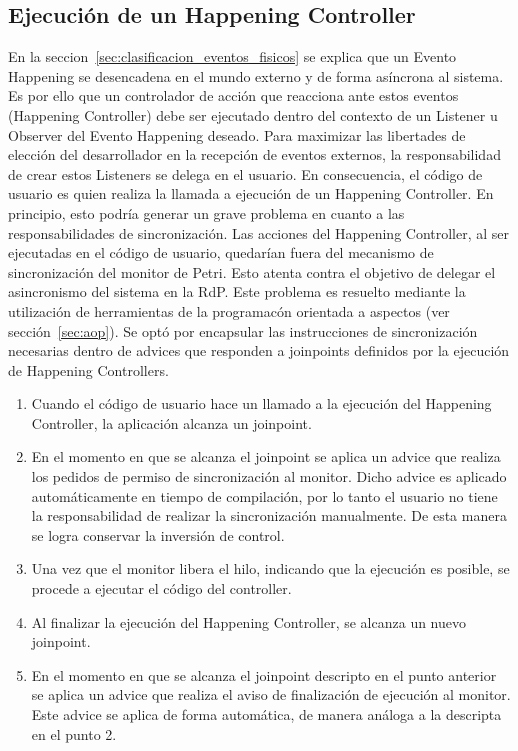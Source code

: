 \subsection{Ejecución de un Happening Controller}
\label{sec:ejecucion_happening_controller}
En la seccion~\ref{sec:clasificacion_eventos_fisicos} se explica que un Evento
Happening se desencadena en el mundo externo y de forma asíncrona al sistema. Es
por ello que un controlador de acción que reacciona ante estos
eventos (Happening Controller) debe ser ejecutado dentro del contexto de un
Listener u Observer del Evento Happening deseado.
Para maximizar las libertades de elección del desarrollador en la recepción de
eventos externos, la responsabilidad de crear estos Listeners se delega en el
usuario. En consecuencia, el código de usuario es quien realiza la llamada a
ejecución de un Happening Controller.
En principio, esto podría generar un grave problema en cuanto a las
responsabilidades de sincronización.
Las acciones del Happening Controller, al ser ejecutadas en el código de
usuario, quedarían fuera del mecanismo de sincronización del monitor de Petri.
Esto atenta contra el objetivo de delegar el asincronismo del sistema en la RdP.
Este problema es resuelto mediante la utilización de herramientas de la
programacón orientada a aspectos (ver sección~\ref{sec:aop}). Se optó por
encapsular las instrucciones de sincronización necesarias dentro de advices que responden a
joinpoints definidos por la ejecución de Happening Controllers.
\begin{enumerate}
  \item Cuando el código de usuario hace un llamado a la ejecución del Happening
  Controller, la aplicación alcanza un joinpoint.
  \item En el momento en que se alcanza el joinpoint se aplica un advice que
  realiza los pedidos de permiso de sincronización al monitor. Dicho advice es
  aplicado automáticamente en tiempo de compilación, por lo tanto el usuario no
  tiene la responsabilidad de realizar la sincronización manualmente. De esta
  manera se logra conservar la inversión de control.
  \item Una vez que el monitor libera el hilo, indicando que la ejecución es
  posible, se procede a ejecutar el código del controller.
  \item Al finalizar la ejecución del Happening Controller, se alcanza un nuevo
  joinpoint.
  \item En el momento en que se alcanza el joinpoint descripto en el punto
  anterior se aplica un advice que realiza el aviso de finalización de
  ejecución al monitor. Este advice se aplica de forma automática, de manera
  análoga a la descripta en el punto 2. 
\end{enumerate}

